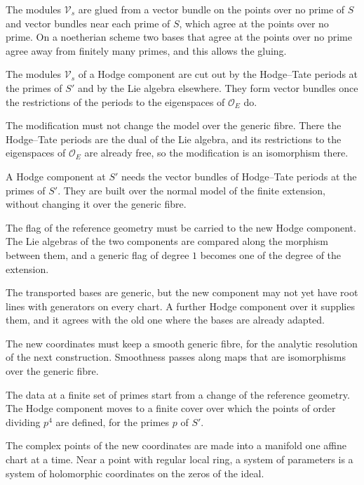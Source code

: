 The modules $\mathcal V_s$ are glued from a vector bundle on the points over no prime of $S$ and vector bundles near each
prime of $S$, which agree at the points over no prime. On a noetherian scheme two bases that agree at the points over no
prime agree away from finitely many primes, and this allows the gluing.

The modules $\mathcal V_s$ of a Hodge component are cut out by the Hodge--Tate periods at the primes of $S'$ and by the
Lie algebra elsewhere. They form vector bundles once the restrictions of the periods to the eigenspaces of
$\mathcal O_E$ do.

The modification must not change the model over the generic fibre. There the Hodge--Tate periods are the dual of the
Lie algebra, and its restrictions to the eigenspaces of $\mathcal O_E$ are already free, so the modification is an
isomorphism there.

A Hodge component at $S'$ needs the vector bundles of Hodge--Tate periods at the primes of $S'$. They are built
over the normal model of the finite extension, without changing it over the generic fibre.

The flag of the reference geometry must be carried to the new Hodge component. The Lie algebras of the two
components are compared along the morphism between them, and a generic flag of degree $1$ becomes one of the
degree of the extension.

The transported bases are generic, but the new component may not yet have root lines with generators on every
chart. A further Hodge component over it supplies them, and it agrees with the old one where the bases are
already adapted.

The new coordinates must keep a smooth generic fibre, for the analytic resolution of the next construction.
Smoothness passes along maps that are isomorphisms over the generic fibre.

The data at a finite set of primes start from a change of the reference geometry. The Hodge component moves to a
finite cover over which the points of order dividing $p^4$ are defined, for the primes $p$ of $S'$.

The complex points of the new coordinates are made into a manifold one affine chart at a time. Near a point with
regular local ring, a system of parameters is a system of holomorphic coordinates on the zeros of the ideal.

